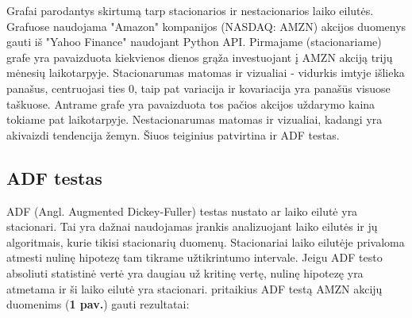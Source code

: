 \documentclass{VUMIFInfKursinis}
\begin{document}
Grafai parodantys skirtumą tarp stacionarios ir nestacionarios laiko eilutės. Grafuose naudojama "Amazon" kompanijos (NASDAQ: AMZN) akcijos duomenys gauti iš "Yahoo Finance" 
naudojant Python API\cite{yfinance}. Pirmajame (stacionariame) grafe yra pavaizduota kiekvienos dienos grąža investuojant į AMZN akciją trijų mėnesių laikotarpyje. 
Stacionarumas matomas ir vizualiai - vidurkis imtyje išlieka panašus, centruojasi ties 0, taip pat
variacija ir kovariacija yra panašūs visuose taškuose. Antrame grafe yra pavaizduota tos pačios akcijos uždarymo kaina tokiame pat laikotarpyje. 
Nestacionarumas matomas ir vizualiai, kadangi yra akivaizdi tendencija žemyn. Šiuos teiginius patvirtina ir ADF testas. %

\subsection{ADF testas}
ADF (Angl. Augmented Dickey-Fuller) testas nustato ar laiko eilutė yra stacionari. Tai yra dažnai naudojamas įrankis analizuojant laiko eilutės ir jų algoritmais, kurie tikisi stacionarių 
duomenų\cite{chi2018stock}. Stacionariai laiko eilutėje privaloma atmesti nulinę hipotezę tam tikrame užtikrintumo intervale. 
Jeigu ADF testo absoliuti statistinė vertė yra daugiau už kritinę vertę, nulinę hipotezę yra atmetama ir ši laiko eilutė yra stacionari.
pritaikius ADF testą{\cite{seabold2010statsmodels}} AMZN akcijų duomenims (\textbf{1 pav.}) gauti rezultatai:
\end{document}
